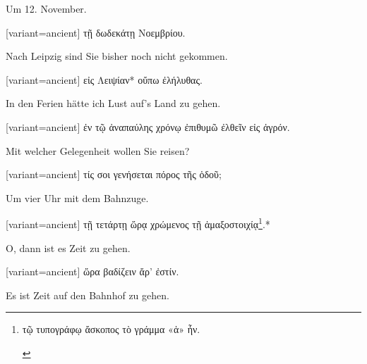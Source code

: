 Um 12. November.

\switchcolumn

\begin{greek}[variant=ancient]%
τῇ δωδεκάτῃ Νοεμβρίου.

\end{greek}%
\switchcolumn*

Nach Leipzig sind Sie bis\textcompwordmark{}her noch nicht gekommen.

\switchcolumn

\begin{greek}[variant=ancient]%
εἰς Λειψίαν{*} οὔπω ἐλήλυθας.

\end{greek}%
\switchcolumn*

In den Ferien hätte ich Lust auf's Land zu gehen.

\switchcolumn

\begin{greek}[variant=ancient]%
ἐν τῷ ἀναπαύλης χρόνῳ ἐπιθυμῶ ἐλθεῖν εἰς ἀγρόν.

\end{greek}%
\switchcolumn*

Mit welcher Gelegenheit wollen Sie reisen?

\switchcolumn

\begin{greek}[variant=ancient]%
τίς σοι γενήσεται πόρος τῆς ὁδοῦ;

\end{greek}%
\switchcolumn*

Um vier Uhr mit dem Bahnzuge.

\switchcolumn

\begin{greek}[variant=ancient]%
τῇ τετάρτῃ ὥρᾳ χρώμενος τῇ ἁμαξοστοιχίᾳ\footnote{\begin{latin}%
\textgreek[variant=ancient]{τῷ τυπογράφῳ ἄσκοπος τὸ γράμμα «ἁ» ἦν.}\end{latin}%
}.{*}

\end{greek}%
\switchcolumn*

O, dann ist es Zeit zu gehen.

\switchcolumn

\begin{greek}[variant=ancient]%
ὥρα βαδίζειν ἄρ' ἐστίν.

\end{greek}%
\switchcolumn*

Es ist Zeit auf den Bahnhof zu gehen.

